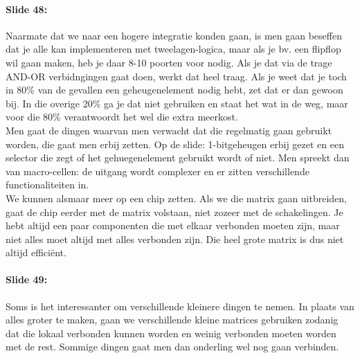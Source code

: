 \documentclass[10pt,a4paper]{book}
\begin{document}
\paragraph{Slide 48:} Naarmate dat we naar een hogere integratie konden gaan, is men gaan beseffen dat je alle kan implementeren met tweelagen-logica, maar als je bv. een flipflop wil gaan maken, heb je daar 8-10 poorten voor nodig. Als je dat via de trage AND-OR verbidngingen gaat doen, werkt dat heel traag. Als je weet dat je toch in 80\% van de gevallen een geheugenelement nodig hebt, zet dat er dan gewoon bij. In die overige 20\% ga je dat niet gebruiken en staat het wat in de weg, maar voor die 80\% verantwoordt het wel die extra meerkost.\\
Men gaat de dingen waarvan men verwacht dat die regelmatig gaan gebruikt worden, die gaat men erbij zetten. Op de slide: 1-bitgeheugen erbij gezet en een selector die zegt of het gehuegenelement gebruikt wordt of niet. Men spreekt dan van macro-cellen: de uitgang wordt complexer en er zitten verschillende functionaliteiten in. \\
We kunnen alsmaar meer op een chip zetten. Als we die matrix gaan uitbreiden, gaat de chip eerder met de matrix volstaan, niet zozeer met de schakelingen. Je hebt altijd een paar componenten die met elkaar verbonden moeten zijn, maar niet alles moet altijd met alles verbonden zijn. Die heel grote matrix is dus niet altijd effici\"ent.

\paragraph{Slide 49:} Soms is het interessanter om verschillende kleinere dingen te nemen. In plaats van alles groter te maken, gaan we verschillende kleine matrices gebruiken zodanig dat die lokaal verbonden kunnen worden en weinig verbonden moeten worden met de rest. Sommige dingen gaat men dan onderling wel nog gaan verbinden.
\end{document}
